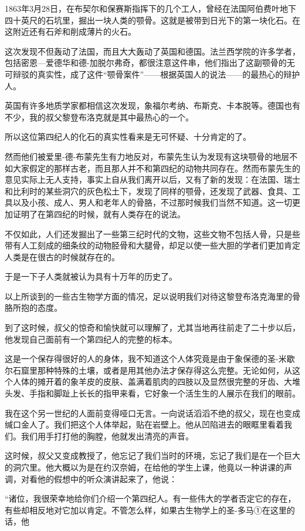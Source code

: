 \documentclass[10pt]{book}
\begin{document}
1863年3月28日，在布契尔和保赛斯指挥下的几个工人，曾经在法国阿伯费叶地下四十英尺的石坑里，掘出一块人类的颚骨。这就是被带到日光下的第一块化石。在这附近还有石斧和削成薄片的火石。

这次发现不但轰动了法国，而且大大轰动了英国和德国。法兰西学院的许多学者，包括密恩—爱德华和德-加脱尔弗奇，都很注意这件串，他们指出了这副颚骨的无可辩驳的真实性，成了这件“颚骨案件”——根据英国人的说法——的最热心的辩护人。

英国有许多地质学家都相信这次发现，象福尔考纳、布斯克、卡本脱等。德国也有不少，我的叔父黎登布洛克就是其中最热心的一个。

所以这位第四纪人的化石的真实性看来是无可怀疑、十分肯定的了。

然而他们被爱里-德-布蒙先生有力地反对，布蒙先生认为发现有这块颚骨的地层不如大家假定的那样古老，而且那人并不和第四纪的动物共同存在。然而布蒙先生的意见实际上无人支持，事实上自从我们离开以后，又有了新的发现：在法国、瑞士和比利时的某些洞穴的灰色松土下，发现了同样的颚骨，还发现了武器、食具、工具以及小孩、成人、男人和老年人的骨胳，不过那时候我们当然不知道。这一切更加证明了在第四纪的时候，就有人类存在的说法。

不仅如此，人们还发掘出了一些第三纪时代的文物，这些文物不包括人骨，只是些带有人工刻成的细条纹的动物胫骨和大腿骨，却足以使一些大胆的学者们更加肯定人类是在很古的时候就存在的。

于是一下子人类就被认为具有十万年的历史了。

以上所谈到的一些古生物学方面的情况，足以说明我们对待这黎登布洛克海里的骨胳所抱的态度。

到了这时候，叔父的惊奇和愉快就可以理解了，尤其当地再往前走了二十步以后，他发现自己面前有一个第四纪人的完整的标本。

这是一个保存得很好的人的身体，我不知道这个人体究竟是由于象保德的圣-米歇尔石窟里那种特殊的土壤，或者是用其他办法才保存得这么完整。无论如何，从这个人体的摊开着的象羊皮的皮肤、盖满着肌肉的四肢以及显然很完整的牙齿、大堆头发、手指和脚趾上长长的指甲来看，它好象一个活生生的人展示在我们的眼前。

我在这个另一世纪的人面前变得哑口无言。一向说话滔滔不绝的叔父，现在也变成缄口金人了。我们把这个人体举起，贴在岩壁上。他从凹陷进去的眼眶里看着我们。我们用手打打他的胸膛，他就发出清亮的声音。

这时候，叔父又变成教授了，他忘记了我们当时的环境，忘记了我们是在一个巨大的洞穴里。他大概以为是在约汉奈姆，在给他的学生上课，他竟以一种讲课的声调，对看他的假想中的听众演讲起来了，他说：

“诸位，我很荣幸地给你们介绍一个第四纪人。有一些伟大的学者否定它的存在，有些却相反地对它加以肯定。不管怎么样，如果古生物学上的圣-多马①在这里的话，他
\end{document}
